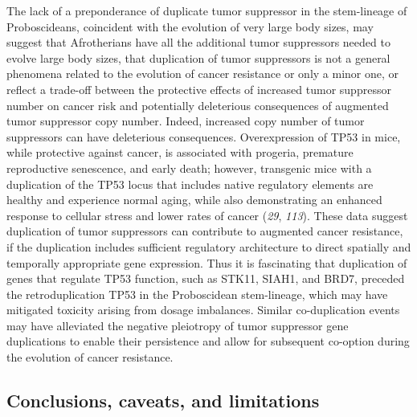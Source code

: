 \documentclass[]{elsarticle} %
\begin{document}
The lack of a preponderance of duplicate tumor suppressor in the stem-lineage of Proboscideans, coincident with the evolution of very large body sizes, may suggest that Afrotherians have all the additional tumor suppressors needed to evolve large body sizes, that duplication of tumor suppressors is not a general phenomena related to the evolution of cancer resistance or only a minor one, or reflect a trade-off between the protective effects of increased tumor suppressor number on cancer risk and potentially deleterious consequences of augmented tumor suppressor copy number. Indeed, increased copy number of tumor suppressors can have deleterious consequences. Overexpression of TP53 in mice, while protective against cancer, is associated with progeria, premature reproductive senescence, and early death; however, transgenic mice with a duplication of the TP53 locus that includes native regulatory elements are healthy and experience normal aging, while also demonstrating an enhanced response to cellular stress and lower rates of cancer (\emph{29}, \emph{113}). These data suggest duplication of tumor suppressors can contribute to augmented cancer resistance, if the duplication includes sufficient regulatory architecture to direct spatially and temporally appropriate gene expression. Thus it is fascinating that duplication of genes that regulate TP53 function, such as STK11, SIAH1, and BRD7, preceded the retroduplication TP53 in the Proboscidean stem-lineage, which may have mitigated toxicity arising from dosage imbalances. Similar co-duplication events may have alleviated the negative pleiotropy of tumor suppressor gene duplications to enable their persistence and allow for subsequent co-option during the evolution of cancer resistance.

\hypertarget{conclusions-caveats-and-limitations}{%
\subsection{Conclusions, caveats, and limitations}\label{conclusions-caveats-and-limitations}}
\end{document}
